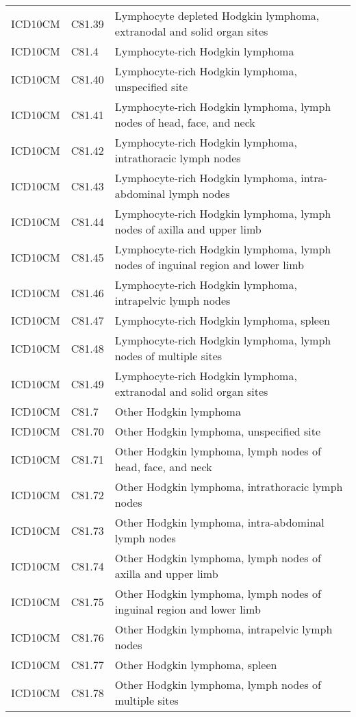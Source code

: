\begin{longtable}{p{}p{}p{}}
  ICD10CM & C81.39 & Lymphocyte depleted Hodgkin lymphoma, extranodal and solid organ sites \\ 
  ICD10CM & C81.4 & Lymphocyte-rich Hodgkin lymphoma \\ 
  ICD10CM & C81.40 & Lymphocyte-rich Hodgkin lymphoma, unspecified site \\ 
  ICD10CM & C81.41 & Lymphocyte-rich Hodgkin lymphoma, lymph nodes of head, face, and neck \\ 
  ICD10CM & C81.42 & Lymphocyte-rich Hodgkin lymphoma, intrathoracic lymph nodes \\ 
  ICD10CM & C81.43 & Lymphocyte-rich Hodgkin lymphoma, intra-abdominal lymph nodes \\ 
  ICD10CM & C81.44 & Lymphocyte-rich Hodgkin lymphoma, lymph nodes of axilla and upper limb \\ 
  ICD10CM & C81.45 & Lymphocyte-rich Hodgkin lymphoma, lymph nodes of inguinal region and lower limb \\ 
  ICD10CM & C81.46 & Lymphocyte-rich Hodgkin lymphoma, intrapelvic lymph nodes \\ 
  ICD10CM & C81.47 & Lymphocyte-rich Hodgkin lymphoma, spleen \\ 
  ICD10CM & C81.48 & Lymphocyte-rich Hodgkin lymphoma, lymph nodes of multiple sites \\ 
  ICD10CM & C81.49 & Lymphocyte-rich Hodgkin lymphoma, extranodal and solid organ sites \\ 
  ICD10CM & C81.7 & Other Hodgkin lymphoma \\ 
  ICD10CM & C81.70 & Other Hodgkin lymphoma, unspecified site \\ 
  ICD10CM & C81.71 & Other Hodgkin lymphoma, lymph nodes of head, face, and neck \\ 
  ICD10CM & C81.72 & Other Hodgkin lymphoma, intrathoracic lymph nodes \\ 
  ICD10CM & C81.73 & Other Hodgkin lymphoma, intra-abdominal lymph nodes \\ 
  ICD10CM & C81.74 & Other Hodgkin lymphoma, lymph nodes of axilla and upper limb \\ 
  ICD10CM & C81.75 & Other Hodgkin lymphoma, lymph nodes of inguinal region and lower limb \\ 
  ICD10CM & C81.76 & Other Hodgkin lymphoma, intrapelvic lymph nodes \\ 
  ICD10CM & C81.77 & Other Hodgkin lymphoma, spleen \\ 
  ICD10CM & C81.78 & Other Hodgkin lymphoma, lymph nodes of multiple sites \\ 

\end{longtable}
